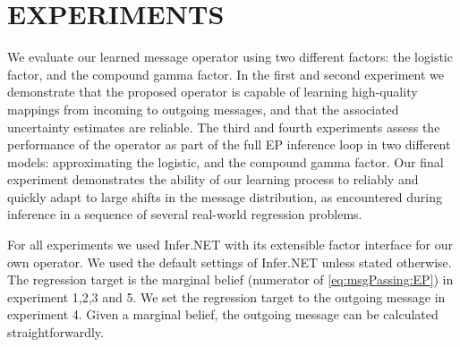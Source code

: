 \documentclass[english]{article}
\theoremstyle{plain}
\theoremstyle{plain}
\newcommand{\factor}{f}				%
\newcommand{\msg}[2]{m_{#1 \rightarrow #2}}			%
\begin{document}
\section{EXPERIMENTS  }
\label{sec:Experiments}

We evaluate our learned message operator using two different factors: the logistic factor, and the compound gamma factor. In the first and second experiment we demonstrate that the proposed operator is capable of learning high-quality mappings from incoming to outgoing messages, and that the associated uncertainty estimates are  reliable. The third and fourth experiments assess the performance of the operator as part of the full EP inference loop in two different models: approximating the logistic, and the compound gamma factor. Our final experiment demonstrates the  ability of our learning process to reliably and quickly adapt to large shifts in the message distribution, as encountered during inference in a sequence of several real-world regression problems. 


For all experiments we used Infer.NET \citep{Minka2014} with its extensible factor interface for our own operator. 
We used the default settings of Infer.NET unless stated otherwise. 
The regression target is the marginal belief (numerator of \eqref{eq:msgPassing:EP}) in experiment 1,2,3 and 5. We set the regression target to the outgoing message in experiment 4. 
Given a marginal belief, the outgoing message can be calculated straightforwardly.


\end{document}
